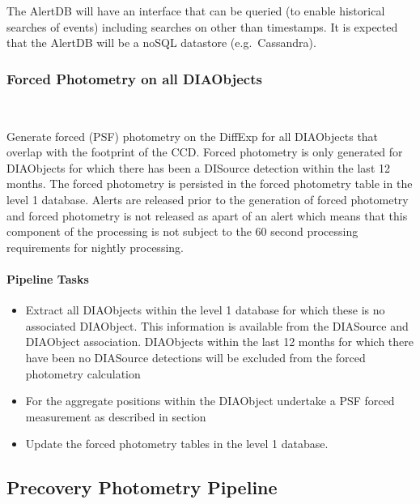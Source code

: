 The AlertDB will have an interface that can be queried (to enable historical searches of events) including searches on other than timestamps. It is expected that the AlertDB will be a noSQL datastore (e.g.\ Cassandra).



\subsubsection{Forced Photometry on all DIAObjects}~

Generate forced (PSF) photometry on the DiffExp for all DIAObjects that overlap with the footprint of the CCD. Forced photometry is only generated for DIAObjects for which there has been a DISource detection within the last 12 months. The forced photometry is persisted in the forced photometry table in the level 1 database. Alerts are released prior to the generation of forced photometry and forced photometry is not released as apart of an alert which means that this component of the processing is not subject to the 60 second processing requirements for nightly processing.

\paragraph{Pipeline Tasks}
\begin{itemize}
\item Extract all DIAObjects within the level 1 database for which these is no associated DIAObject. This information is available from the DIASource and DIAObject association.  DIAObjects within the last 12 months for which there have been no DIASource detections will be excluded from the forced photometry calculation
\item For the aggregate positions within the DIAObject undertake a PSF forced measurement as described in section \hyperref[sec:acForcedMeasurement]{}
\item Update the forced photometry tables in the level 1 database.
\end{itemize}



\clearpage

\subsection{Precovery Photometry Pipeline}

